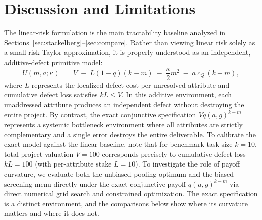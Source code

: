 \documentclass[11pt]{article}
\begin{document}
\section{Discussion and Limitations}
\label{sec:discussion}

The linear-risk formulation is the main tractability baseline analyzed in Sections~\ref{sec:stackelberg}--\ref{sec:compare}. Rather than viewing linear risk solely as a small-risk Taylor approximation, it is properly understood as an independent, additive-defect primitive model:
\[
U(m,a;\kappa) \;=\; V \;-\; L(1-q)(k-m) \;-\; \frac{\kappa}{2}m^2 \;-\; a\,c_Q\,(k-m),
\]
where $L$ represents the localized defect cost per unresolved attribute and cumulative defect loss satisfies $k L \le V$. In this additive environment, each unaddressed attribute produces an independent defect without destroying the entire project. By contrast, the exact conjunctive specification $V q(a,g)^{k-m}$ represents a systemic bottleneck environment where all attributes are strictly complementary and a single error destroys the entire deliverable.
To calibrate the exact model against the linear baseline, note that for benchmark task size $k = 10$, total project valuation $V = 100$ corresponds precisely to cumulative defect loss $k L = 100$ (with per-attribute stake $L = 10$).
To investigate the role of payoff curvature, we evaluate both the unbiased pooling optimum and the biased screening menu directly under the exact conjunctive payoff $q(a,g)^{k-m}$ via direct numerical grid search and constrained optimization.
The exact specification is a distinct environment, and the comparisons below show where its curvature matters and where it does not.
\end{document}
